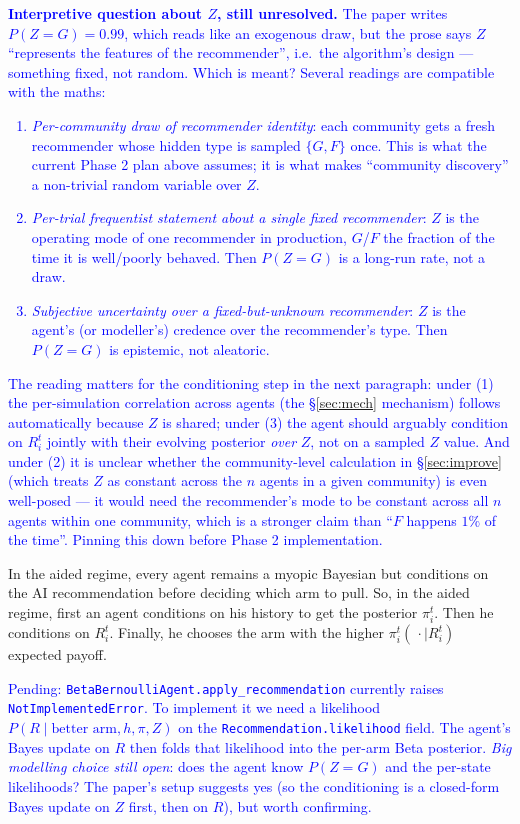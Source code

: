 \documentclass[12pt]{article}
\newcommand{\ignacio}[1]{\textcolor{blue}{#1}}
\begin{document}
\ignacio{\textbf{Interpretive question about $Z$, still unresolved.} The paper writes $P(Z=G)=0.99$, which reads like an exogenous draw, but the prose says $Z$ ``represents the features of the recommender'', i.e.\ the algorithm's design --- something fixed, not random. Which is meant? Several readings are compatible with the maths:
\begin{enumerate}[leftmargin=*]
  \item \emph{Per-community draw of recommender identity}: each community gets a fresh recommender whose hidden type is sampled $\{G,F\}$ once. This is what the current Phase 2 plan above assumes; it is what makes ``community discovery'' a non-trivial random variable over $Z$.
  \item \emph{Per-trial frequentist statement about a single fixed recommender}: $Z$ is the operating mode of one recommender in production, $G$/$F$ the fraction of the time it is well/poorly behaved. Then $P(Z=G)$ is a long-run rate, not a draw.
  \item \emph{Subjective uncertainty over a fixed-but-unknown recommender}: $Z$ is the agent's (or modeller's) credence over the recommender's type. Then $P(Z=G)$ is epistemic, not aleatoric.
\end{enumerate}
The reading matters for the conditioning step in the next paragraph: under (1) the per-simulation correlation across agents (the \S\ref{sec:mech} mechanism) follows automatically because $Z$ is shared; under (3) the agent should arguably condition on $R_i^t$ jointly with their evolving posterior \emph{over} $Z$, not on a sampled $Z$ value. And under (2) it is unclear whether the community-level calculation in \S\ref{sec:improve} (which treats $Z$ as constant across the $n$ agents in a given community) is even well-posed --- it would need the recommender's mode to be constant across all $n$ agents within one community, which is a stronger claim than ``$F$ happens $1\%$ of the time''. Pinning this down before Phase 2 implementation.}

In the aided regime, every agent remains a myopic Bayesian but conditions on the AI recommendation before deciding which arm to pull.
So, in the aided regime, first an agent conditions on his history to get the posterior $\pi_i^t$.
Then he conditions on $R_i^t$.
Finally, he chooses the arm with the higher $\pi_i^t(\,\cdot \mid R_i^t)$ expected payoff.

\ignacio{Pending: \texttt{BetaBernoulliAgent.apply\_recommendation} currently raises \texttt{NotImplementedError}. To implement it we need a likelihood $P(R \mid \text{better arm}, h, \pi, Z)$ on the \texttt{Recommendation.likelihood} field. The agent's Bayes update on $R$ then folds that likelihood into the per-arm Beta posterior. \emph{Big modelling choice still open}: does the agent know $P(Z=G)$ and the per-state likelihoods? The paper's setup suggests yes (so the conditioning is a closed-form Bayes update on $Z$ first, then on $R$), but worth confirming.}
\end{document}
